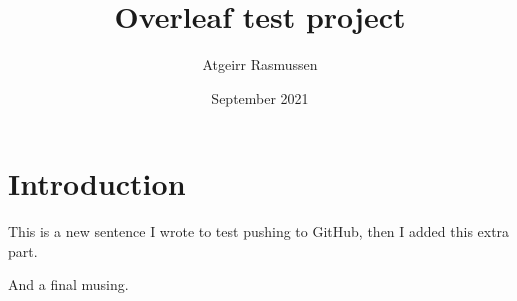 \documentclass{article}
\title{Overleaf test project}
\author{Atgeirr Rasmussen}
\date{September 2021}
\begin{document}
\maketitle

\section{Introduction}

This is a new sentence I wrote to test pushing to GitHub, then I added this extra part.

And a final musing.
\end{document}

